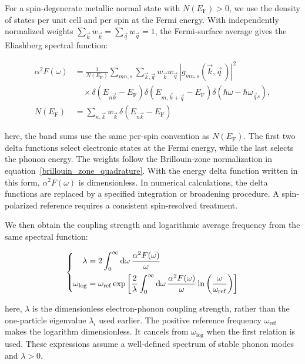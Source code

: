 For a spin-degenerate metallic normal state with $N(E_\mathrm{F})>0$,
we use the density of states per unit cell and per spin at the Fermi energy.
With independently normalized weights $\sum_{\vec{k}}w_{\vec{k}}=\sum_{\vec{q}}w_{\vec{q}}=1$,
the Fermi-surface average gives the Eliashberg spectral function:

\begin{equation}
\begin{aligned}
    \alpha^2F(\omega)
    &=
    \frac{1}{N(E_\mathrm{F})}
    \sum_{mn,s}\sum_{\vec{k},\vec{q}}
    w_{\vec{k}}w_{\vec{q}}\,
    |g_{mn,s}(\vec{k},\vec{q}\,)|^2 \\
    &\quad\times
    \delta(E_{n\vec{k}}-E_\mathrm{F})
    \delta(E_{m,\vec{k}+\vec{q}}-E_\mathrm{F})
    \delta(\hbar\omega-\hbar\omega_{\vec{q}s}), \\
    N(E_\mathrm{F})
    &=\sum_{n,\vec{k}}w_{\vec{k}}\,
    \delta(E_{n\vec{k}}-E_\mathrm{F})
\end{aligned}
\label{eliashberg_spectral_function_method}
\end{equation}

here, the band sums use the same per-spin convention as $N(E_\mathrm{F})$.
The first two delta functions select electronic states at the Fermi energy,
while the last selects the phonon energy.
The weights follow the Brillouin-zone normalization in equation~\eqref{brillouin_zone_quadrature}.
With the energy delta function written in this form, $\alpha^2F(\omega)$ is dimensionless.
In numerical calculations, the delta functions are replaced by a specified integration or broadening procedure.
A spin-polarized reference requires a consistent spin-resolved treatment.

We then obtain the coupling strength and logarithmic average frequency from the same spectral function:

\begin{equation}
\left\{\begin{aligned}
    \lambda
    &=2\int_0^\infty\mathrm{d}{\omega}\,
    \frac{\alpha^2F(\omega)}{\omega} \\
    \omega_\mathrm{log}
    &=\omega_\mathrm{ref}
    \exp\left[
    \frac{2}{\lambda}
    \int_0^\infty\mathrm{d}{\omega}\,
    \frac{\alpha^2F(\omega)}{\omega}
    \ln\left(\frac{\omega}{\omega_\mathrm{ref}}\right)
    \right]
\end{aligned}\right.
\label{electron_phonon_spectral_moments}
\end{equation}

here, $\lambda$ is the dimensionless electron-phonon coupling strength,
rather than the one-particle eigenvalue $\lambda_i$ used earlier.
The positive reference frequency $\omega_\mathrm{ref}$ makes the logarithm dimensionless.
It cancels from $\omega_\mathrm{log}$ when the first relation is used.
These expressions assume a well-defined spectrum of stable phonon modes and $\lambda>0$.

